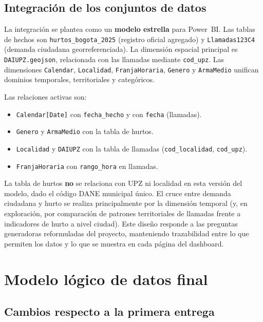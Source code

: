 \documentclass[12pt,letterpaper]{article}
\begin{document}
\subsection{Integración de los conjuntos de datos}

La integración se plantea como un \textbf{modelo estrella} para Power~BI. Las tablas de hechos son \texttt{hurtos\_bogota\_2025} (registro oficial agregado) y \texttt{Llamadas123C4} (demanda ciudadana georreferenciada). La dimensión espacial principal es \texttt{DAIUPZ.geojson}, relacionada con las llamadas mediante \texttt{cod\_upz}. Las dimensiones \texttt{Calendar}, \texttt{Localidad}, \texttt{FranjaHoraria}, \texttt{Genero} y \texttt{ArmaMedio} unifican dominios temporales, territoriales y categóricos.

Las relaciones activas son:
\begin{itemize}[noitemsep, topsep=0pt]
    \item \texttt{Calendar[Date]} con \texttt{fecha\_hecho} y con \texttt{fecha} (llamadas).
    \item \texttt{Genero} y \texttt{ArmaMedio} con la tabla de hurtos.
    \item \texttt{Localidad} y \texttt{DAIUPZ} con la tabla de llamadas (\texttt{cod\_localidad}, \texttt{cod\_upz}).
    \item \texttt{FranjaHoraria} con \texttt{rango\_hora} en llamadas.
\end{itemize}

La tabla de hurtos \textbf{no} se relaciona con UPZ ni localidad en esta versión del modelo, dado el código DANE municipal único. El cruce entre demanda ciudadana y hurto se realiza principalmente por la dimensión temporal (y, en exploración, por comparación de patrones territoriales de llamadas frente a indicadores de hurto a nivel ciudad). Este diseño responde a las preguntas generadoras reformuladas del proyecto, manteniendo trazabilidad entre lo que permiten los datos y lo que se muestra en cada página del dashboard.

\section{Modelo lógico de datos final}

\subsection{Cambios respecto a la primera entrega}
\end{document}
